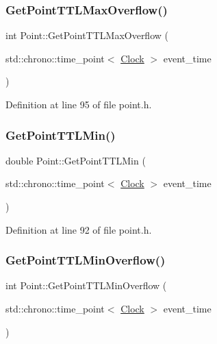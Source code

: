 \subsubsection{\texorpdfstring{Get\+Point\+T\+T\+L\+Max\+Overflow()}{GetPointTTLMaxOverflow()}}
{\footnotesize\ttfamily int Point\+::\+Get\+Point\+T\+T\+L\+Max\+Overflow (\begin{DoxyParamCaption}\item[{std\+::chrono\+::time\+\_\+point$<$ \hyperlink{universe_8h_a0ef8d951d1ca5ab3cfaf7ab4c7a6fd80}{Clock} $>$}]{event\+\_\+time }\end{DoxyParamCaption})\hspace{0.3cm}{\ttfamily [inline]}}



Definition at line 95 of file point.\+h.

\mbox{\label{class_point_a272b99a9cd054b09c8944b9f0e657890}} 
\subsubsection{\texorpdfstring{Get\+Point\+T\+T\+L\+Min()}{GetPointTTLMin()}}
{\footnotesize\ttfamily double Point\+::\+Get\+Point\+T\+T\+L\+Min (\begin{DoxyParamCaption}\item[{std\+::chrono\+::time\+\_\+point$<$ \hyperlink{universe_8h_a0ef8d951d1ca5ab3cfaf7ab4c7a6fd80}{Clock} $>$}]{event\+\_\+time }\end{DoxyParamCaption})\hspace{0.3cm}{\ttfamily [inline]}}



Definition at line 92 of file point.\+h.

\mbox{\label{class_point_a72b222f880df30ebcc12ddc1a6d430b5}} 
\subsubsection{\texorpdfstring{Get\+Point\+T\+T\+L\+Min\+Overflow()}{GetPointTTLMinOverflow()}}
{\footnotesize\ttfamily int Point\+::\+Get\+Point\+T\+T\+L\+Min\+Overflow (\begin{DoxyParamCaption}\item[{std\+::chrono\+::time\+\_\+point$<$ \hyperlink{universe_8h_a0ef8d951d1ca5ab3cfaf7ab4c7a6fd80}{Clock} $>$}]{event\+\_\+time }\end{DoxyParamCaption})\hspace{0.3cm}{\ttfamily [inline]}}



